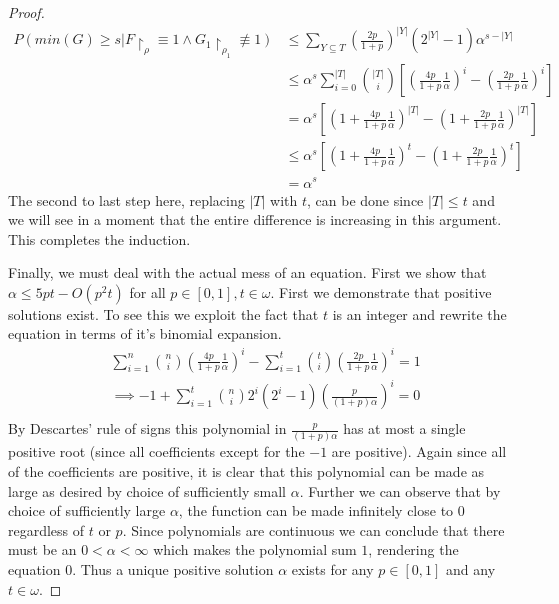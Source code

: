 \begin{proof}
\begin{align*}
	P(min(G) \geq s | F \restriction_{\rho} \equiv 1 \wedge G_1 \restriction_{\rho_1} \not\equiv 1) &\leq \sum_{Y \subseteq T} \left( \frac{2p}{1+p} \right)^{|Y|}(2^{|Y|}-1)\alpha^{s-|Y|} \\
	&\leq \alpha^s\sum_{i=0}^{|T|} {|T| \choose i}\left[ \left( \frac{4p}{1+p}\frac{1}{\alpha} \right)^i - \left( \frac{2p}{1+p}\frac{1}{\alpha} \right)^i \right] \\
	&= \alpha^s\left[ \left(1+\frac{4p}{1+p}\frac{1}{\alpha} \right)^{|T|} - \left(1+ \frac{2p}{1+p}\frac{1}{\alpha} \right)^{|T|} \right] \\
	&\leq \alpha^s \left[ \left( 1+\frac{4p}{1+p}\frac{1}{\alpha} \right)^t - \left(1+ \frac{2p}{1+p}\frac{1}{\alpha} \right)^t \right] \\
	&= \alpha^s
\end{align*}
The second to last step here, replacing $|T|$ with $t$, can be done since $|T| \leq t$ and we will see in a moment that the entire difference is increasing in this argument. This completes the induction. \par 
Finally, we must deal with the actual mess of an equation. First we show that $\alpha \leq 5pt - O(p^2t)$ for all $p \in [0,1],t \in \omega$. First we demonstrate that positive solutions exist. To see this we exploit the fact that $t$ is an integer and rewrite the equation in terms of it's binomial expansion. 
\begin{align*}
	& \sum_{i=1}^n {n \choose i} \left( \frac{4p}{1+p}\frac{1}{\alpha} \right)^i - \sum_{i=1}^t {t \choose i} \left( \frac{2p}{1+p}\frac{1}{\alpha} \right)^i = 1 \\
	&\implies -1 + \sum_{i=1}^t {n \choose i} 2^i(2^i-1) \left( \frac{p}{(1+p)\alpha} \right)^i  = 0  \\
\end{align*}
By Descartes' rule of signs this polynomial in $\frac{p}{(1+p)\alpha}$ has at most a single positive root (since all coefficients except for the $-1$ are positive). Again since all of the coefficients are positive, it is clear that this polynomial can be made as large as desired by choice of sufficiently small $\alpha$. Further we can observe that by choice of sufficiently large $\alpha$, the function can be made infinitely close to $0$ regardless of $t$ or $p$. Since polynomials are continuous we can conclude that there must be an $0 < \alpha < \infty$ which makes the polynomial sum $1$, rendering the equation $0$. Thus a unique positive solution $\alpha$ exists for any $p \in [0,1]$ and any $t \in \omega$. 

\end{proof}
